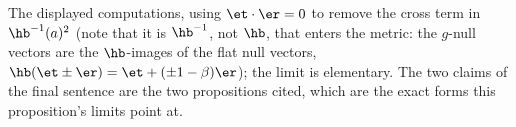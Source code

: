 The displayed computations, using $\et \cdot \er = 0$ to remove the cross term in $\hb^{-1}(a)^{2}$ (note that it is $\hb^{-1}$, not $\hb$, that enters the metric: the $g$-null vectors are the $\hb$-images of the flat null vectors, $\hb(\et \pm \er) = \et + (\pm 1 - \beta)\er$); the limit is elementary. The two claims of the final sentence are the two propositions cited, which are the exact forms this proposition's limits point at.

